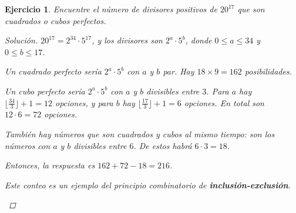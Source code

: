 \documentclass{article}
\theoremstyle{plain}
\newtheorem{ejercicio}{Ejercicio}
\newenvironment{solucion}{\begin{proof}[Solución]}{\end{proof}}
\begin{document}
\pagebreak

\begin{ejercicio}
Encuentre el número de divisores positivos de $20^{17}$ que son cuadrados
o cubos perfectos.

\ifdefined\solutions
\begin{solucion}
    $20^{17} = 2^{34}\cdot 5^{17}$, y los divisores son $2^a\cdot 5^b$, donde
    $0 \le a \le 34$ y $0 \le b \le 17$.
    
    Un cuadrado perfecto sería $2^a\cdot 5^b$ con $a$ y $b$ par.
    Hay $18 \times 9 = 162$ posibilidades.
    
    Un cubo perfecto sería $2^a\cdot 5^b$ con $a$ y $b$ divisibles entre $3$.
    Para $a$ hay $\lfloor\frac{34}{3}\rfloor + 1 = 12$ opciones, y para $b$ hay
    $\lfloor\frac{17}{3}\rfloor + 1 = 6$ opciones.
    En total son $12\cdot 6 = 72$ opciones.
    
    También hay números que son cuadrados y cubos al mismo tiempo: son los
    números con $a$ y $b$ divisibles entre $6$. De estos habrá $6\cdot 3 = 18$.
    
    Entonces, la respuesta es $162 + 72 - 18 = 216$.

    Este conteo es un ejemplo del principio combinatorio de
    \textbf{inclusión-exclusión}.

    \begin{center}
    \end{center}    
\end{solucion}
\fi
\end{ejercicio}

\pagebreak
\end{document}
